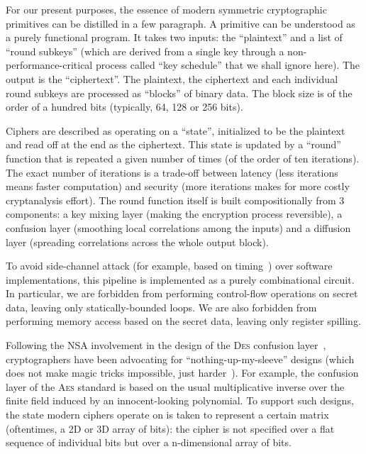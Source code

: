\documentclass[draft,english]{jflart}
\newcommand{\AES}{\textsc{Aes}}
\newcommand{\DES}{\textsc{Des}}
\begin{document}
For our present purposes, the essence of modern symmetric
cryptographic primitives can be distilled in a few paragraph. A
primitive can be understood as a purely functional program. It takes
two inputs: the ``plaintext'' and a list of ``round subkeys'' (which
are derived from a single key through a non-performance-critical
process called ``key schedule'' that we shall ignore here). The output
is the ``ciphertext''. The plaintext, the ciphertext and each
individual round subkeys are processed as ``blocks'' of binary data.
The block size is of the order of a hundred bits (typically, 64, 128
or 256 bits).

Ciphers are described as operating on a ``state'', initialized to be
the plaintext and read off at the end as the ciphertext. This state is
updated by a ``round'' function that is repeated a given number of
times (of the order of ten iterations). The exact number of iterations
is a trade-off between latency (less iterations means faster
computation) and security (more iterations makes for more costly
cryptanalysis effort). The round function itself is built
compositionally from 3 components: a key mixing layer (making the
encryption process reversible), a confusion layer (smoothing local
correlations among the inputs) and a diffusion layer (spreading
correlations across the whole output block).


To avoid side-channel attack (for example, based on
timing~\citep{bernstein:timing-attack-AES}) over software
implementations, this pipeline is implemented as a purely
combinational circuit. In particular, we are forbidden from performing
control-flow operations on secret data, leaving only
statically-bounded loops. We are also forbidden from performing memory
access based on the secret data, leaving only register spilling.


Following the NSA involvement in the design of the \DES{} confusion
layer~\citep{johnson:cold-war-crypto}, cryptographers have been
advocating for ``nothing-up-my-sleeve'' designs (which does not make
magic tricks impossible, just
harder~\citep{bernstein:something-up-my-sleeves}). For example, the
confusion layer of the \AES{} standard is based on the usual
multiplicative inverse over the finite field induced by an
innocent-looking polynomial. To support such designs, the state modern
ciphers operate on is taken to represent a certain matrix
(oftentimes, a 2D or 3D array of bits): the cipher is not specified
over a flat sequence of individual bits but over a n-dimensional array
of bits.
\end{document}
